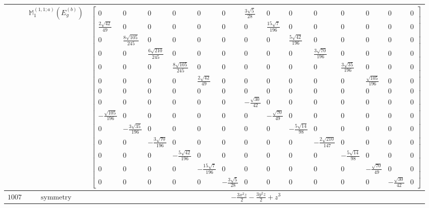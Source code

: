 \documentclass[fleqn,8pt,landscape]{jsarticle}
\begin{document}
\begin{longtable}{ccc}
$  $ & $ \mathbb{M}_{1}^{(1,1;a)}(E_{g}^{(b)}) $ & $ \begin{bmatrix} 0 & 0 & 0 & 0 & 0 & 0 & \frac{3 \sqrt{5}}{28} & 0 & 0 & 0 & 0 & 0 & 0 & 0 \\ \frac{2 \sqrt{42}}{49} & 0 & 0 & 0 & 0 & 0 & 0 & \frac{15 \sqrt{7}}{196} & 0 & 0 & 0 & 0 & 0 & 0 \\ 0 & \frac{8 \sqrt{105}}{245} & 0 & 0 & 0 & 0 & 0 & 0 & \frac{5 \sqrt{42}}{196} & 0 & 0 & 0 & 0 & 0 \\ 0 & 0 & \frac{6 \sqrt{210}}{245} & 0 & 0 & 0 & 0 & 0 & 0 & \frac{3 \sqrt{70}}{196} & 0 & 0 & 0 & 0 \\ 0 & 0 & 0 & \frac{8 \sqrt{105}}{245} & 0 & 0 & 0 & 0 & 0 & 0 & \frac{3 \sqrt{35}}{196} & 0 & 0 & 0 \\ 0 & 0 & 0 & 0 & \frac{2 \sqrt{42}}{49} & 0 & 0 & 0 & 0 & 0 & 0 & \frac{\sqrt{105}}{196} & 0 & 0 \\ 0 & 0 & 0 & 0 & 0 & 0 & 0 & 0 & 0 & 0 & 0 & 0 & 0 & 0 \\ 0 & 0 & 0 & 0 & 0 & 0 & - \frac{\sqrt{30}}{42} & 0 & 0 & 0 & 0 & 0 & 0 & 0 \\ - \frac{\sqrt{105}}{196} & 0 & 0 & 0 & 0 & 0 & 0 & - \frac{\sqrt{70}}{49} & 0 & 0 & 0 & 0 & 0 & 0 \\ 0 & - \frac{3 \sqrt{35}}{196} & 0 & 0 & 0 & 0 & 0 & 0 & - \frac{5 \sqrt{14}}{98} & 0 & 0 & 0 & 0 & 0 \\ 0 & 0 & - \frac{3 \sqrt{70}}{196} & 0 & 0 & 0 & 0 & 0 & 0 & - \frac{2 \sqrt{210}}{147} & 0 & 0 & 0 & 0 \\ 0 & 0 & 0 & - \frac{5 \sqrt{42}}{196} & 0 & 0 & 0 & 0 & 0 & 0 & - \frac{5 \sqrt{14}}{98} & 0 & 0 & 0 \\ 0 & 0 & 0 & 0 & - \frac{15 \sqrt{7}}{196} & 0 & 0 & 0 & 0 & 0 & 0 & - \frac{\sqrt{70}}{49} & 0 & 0 \\ 0 & 0 & 0 & 0 & 0 & - \frac{3 \sqrt{5}}{28} & 0 & 0 & 0 & 0 & 0 & 0 & - \frac{\sqrt{30}}{42} & 0 \end{bmatrix} $ \\ \hline
$ 1007 $ & $ \text{symmetry} $ & $ - \frac{3 x^{2} z}{2} - \frac{3 y^{2} z}{2} + z^{3} $ \\

\end{longtable}
\end{document}
